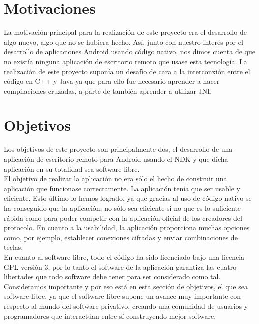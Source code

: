 \section{Motivaciones}

La motivación principal para la realización de este proyecto era el desarrollo de algo nuevo, algo que no se hubiera hecho. Así, junto con nuestro interés por el desarrollo de aplicaciones Android usando código nativo, nos dimos cuenta de que no existía ninguna aplicación de escritorio remoto que usase esta tecnología. La realización de este proyecto suponía un desafío de cara a la interconxión entre el código en C++ y Java ya que para ello fue necesario aprender a hacer compilaciones cruzadas, a parte de también aprender a utilizar JNI.

\section{Objetivos}

Los objetivos de este proyecto son principalmente dos, el desarrollo de una aplicación de escritorio remoto para Android usando el NDK y que dicha aplicación en su totalidad sea software libre.\\

El objetivo de realizar la aplicación no era sólo el hecho de construir una aplicación que funcionase correctamente. La aplicación tenía que ser usable y eficiente. Esto último lo hemos logrado, ya que gracias al uso de código nativo se ha conseguido que la aplicación, no sólo sea eficiente si no que es lo suficiente rápida como para poder competir con la aplicación oficial de los creadores del protocolo. En cuanto a la usabilidad, la aplicación proporciona muchas opciones como, por ejemplo, establecer conexiones cifradas y enviar combinaciones de teclas.\\

En cuanto al software libre, todo el código ha sido licenciado bajo una licencia GPL versión 3, por lo tanto el software de la aplicación garantiza las cuatro libertades que todo software debe tener para ser considerado como tal.\\

Consideramos importante y por eso está en esta sección de objetivos, el que sea software libre, ya que el software libre supone un avance muy importante con respecto al mundo del software privativo, creando una comunidad de usuarios y programadores que interactúan entre sí construyendo mejor software.
